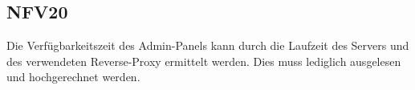 \subsection*{NFV20}

Die Verfügbarkeitszeit des Admin-Panels kann durch die Laufzeit des Servers und des verwendeten Reverse-Proxy ermittelt werden.
Dies muss lediglich ausgelesen und hochgerechnet werden.